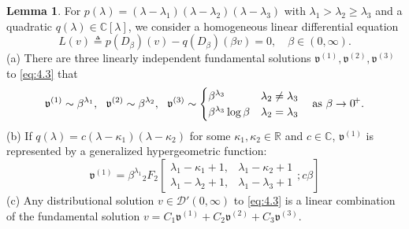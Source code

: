 \documentclass[11pt]{article}
\theoremstyle{definition}
\newtheorem{lemma}[theorem]{Lemma}
\theoremstyle{remark}
\numberwithin{equation}{section}
\newcommand{\mbb}{\mathbb}
\newcommand{\mcal}{\mathcal}
\newcommand{\mfrak}{\mathfrak}
\newcommand{\R}{\mbb{R}}
\newcommand{\C}{\mbb{C}}
\newcommand{\upindex}[1]{^{(#1)}}
\begin{document}
\begin{lemma} \label{lem:4.3}
For $p(\lambda) = (\lambda - \lambda_1)(\lambda - \lambda_2)(\lambda-\lambda_3)$ with $\lambda_1 > \lambda_2 \geq \lambda_3$ and a quadratic $q(\lambda) \in\C[\lambda]$, we consider a homogeneous linear differential equation
\begin{equation} \label{eq:4.3}
	L(v) \triangleq p(D_\beta)(v) - q(D_\beta)(\beta v) = 0, \quad \beta \in (0,\infty).
\end{equation}
(a) There are three linearly independent fundamental solutions $\mfrak{v}\upindex{1}, \mfrak{v}\upindex{2}, \mfrak{v}\upindex{3}$ to \eqref{eq:4.3} that
\begin{equation} \label{eq:4.4}
\mfrak{v}\upindex{1} \sim \beta^{\lambda_1}, ~~ \mfrak{v}\upindex{2} \sim \beta^{\lambda_2},~~  \mfrak{v}\upindex{3} \sim \begin{cases} \beta^{\lambda_3} & \lambda_2 \neq \lambda_3 \\ \beta^{\lambda_3} \log\beta & \lambda_2 = \lambda_3 \end{cases} \quad \text{as}~\beta \to 0\hspace{-.5mm}^+.
\end{equation}
(b) If $q(\lambda) = c(\lambda - \kappa_1)(\lambda - \kappa_2)$ for some $\kappa_1,\kappa_2\in \R$ and $c\in\C$, $\mfrak{v}\upindex{1}$ is represented by a generalized hypergeometric function:
\begin{equation} \label{eq:4.5}
\mfrak{v}\upindex{1} = \beta^{\lambda_1} {}_{2} F_2 \left[ \begin{matrix} \lambda_1 - \kappa_1 + 1, & \lambda_1 - \kappa_2 +1 \\ \lambda_1-\lambda_2 + 1, & \lambda_1 - \lambda_3 + 1 \end{matrix} ; c\beta \right]
\end{equation}
(c) Any distributional solution $v \in \mcal{D}'(0,\infty)$ to \eqref{eq:4.3} is a linear combination of the fundamental solution $v = C_1 \mfrak{v}\upindex{1} + C_2 \mfrak{v}\upindex{2} + C_3 \mfrak{v}\upindex{3}$.
\end{lemma}
\end{document}
